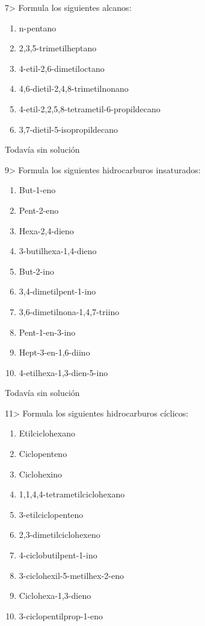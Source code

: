 \documentclass{article}
\begin{document}
\begin{exercise}
  7> Formula los siguientes alcanos:
  \begin{enumerate}
    \item n-pentano
    \item 2,3,5-trimetilheptano
    \item 4-etil-2,6-dimetiloctano
    \item 4,6-dietil-2,4,8-trimetilnonano
    \item 4-etil-2,2,5,8-tetrametil-6-propildecano
    \item 3,7-dietil-5-isopropildecano
  \end{enumerate}
\end{exercise}

\begin{solution}[print=false]
  Todavía sin solución
\end{solution}

\begin{exercise}
  9> Formula los siguientes hidrocarburos insaturados:
  \begin{enumerate}
    \item But-1-eno
    \item Pent-2-eno
    \item Hexa-2,4-dieno
    \item 3-butilhexa-1,4-dieno
    \item But-2-ino
    \item 3,4-dimetilpent-1-ino
    \item 3,6-dimetilnona-1,4,7-triino
    \item Pent-1-en-3-ino
    \item Hept-3-en-1,6-diino
    \item 4-etilhexa-1,3-dien-5-ino
  \end{enumerate}
\end{exercise}

\begin{solution}[print=false]
  Todavía sin solución
\end{solution}

\begin{exercise}
  11> Formula los siguientes hidrocarburos cíclicos:
  \begin{enumerate}
    \item Etilciclohexano
    \item Ciclopenteno
    \item Ciclohexino
    \item 1,1,4,4-tetrametilciclohexano
    \item 3-etilciclopenteno
    \item 2,3-dimetilciclohexeno
    \item 4-ciclobutilpent-1-ino
    \item 3-ciclohexil-5-metilhex-2-eno
    \item Ciclohexa-1,3-dieno
    \item 3-ciclopentilprop-1-eno
  \end{enumerate}
\end{exercise}
\end{document}
